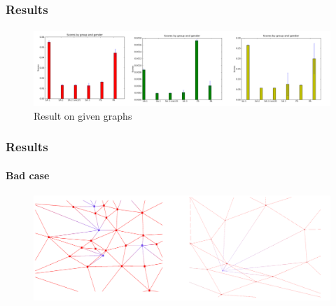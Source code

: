 \begin{frame}
\frametitle{Results}
\framesubtitle{}
\begin{exampleblock}{}
\begin{figure}[!h]
\centering
\includegraphics[scale=0.4]{../rapport/img/histo.png}
\caption{Result on given graphs}
\end{figure}
\end{exampleblock}{}
\end{frame}



\begin{frame}
\frametitle{Results}
\framesubtitle{Bad case}
\begin{exampleblock}{}
\begin{figure}[!h]
\centering
\includegraphics[scale=0.4]{../rapport/img/bad_case.png}
\end{figure}
\end{exampleblock}{}
\end{frame}

